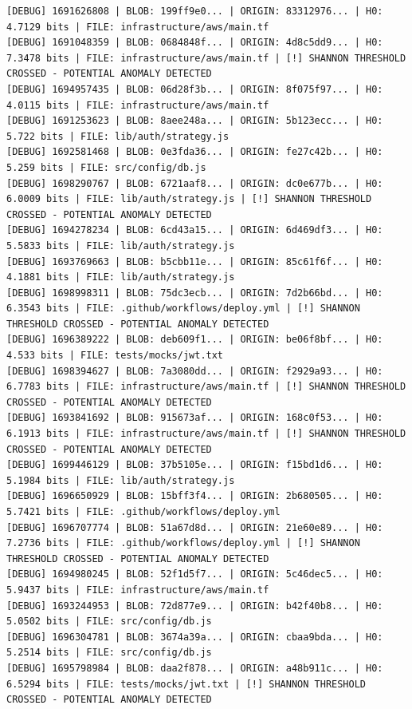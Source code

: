 \documentclass[12pt, a4paper, oneside]{report}
\begin{document}
\begin{lstlisting}[basicstyle=\tiny\ttfamily]
[DEBUG] 1691626808 | BLOB: 199ff9e0... | ORIGIN: 83312976... | H0: 4.7129 bits | FILE: infrastructure/aws/main.tf
[DEBUG] 1691048359 | BLOB: 0684848f... | ORIGIN: 4d8c5dd9... | H0: 7.3478 bits | FILE: infrastructure/aws/main.tf | [!] SHANNON THRESHOLD CROSSED - POTENTIAL ANOMALY DETECTED
[DEBUG] 1694957435 | BLOB: 06d28f3b... | ORIGIN: 8f075f97... | H0: 4.0115 bits | FILE: infrastructure/aws/main.tf
[DEBUG] 1691253623 | BLOB: 8aee248a... | ORIGIN: 5b123ecc... | H0: 5.722 bits | FILE: lib/auth/strategy.js
[DEBUG] 1692581468 | BLOB: 0e3fda36... | ORIGIN: fe27c42b... | H0: 5.259 bits | FILE: src/config/db.js
[DEBUG] 1698290767 | BLOB: 6721aaf8... | ORIGIN: dc0e677b... | H0: 6.0009 bits | FILE: lib/auth/strategy.js | [!] SHANNON THRESHOLD CROSSED - POTENTIAL ANOMALY DETECTED
[DEBUG] 1694278234 | BLOB: 6cd43a15... | ORIGIN: 6d469df3... | H0: 5.5833 bits | FILE: lib/auth/strategy.js
[DEBUG] 1693769663 | BLOB: b5cbb11e... | ORIGIN: 85c61f6f... | H0: 4.1881 bits | FILE: lib/auth/strategy.js
[DEBUG] 1698998311 | BLOB: 75dc3ecb... | ORIGIN: 7d2b66bd... | H0: 6.3543 bits | FILE: .github/workflows/deploy.yml | [!] SHANNON THRESHOLD CROSSED - POTENTIAL ANOMALY DETECTED
[DEBUG] 1696389222 | BLOB: deb609f1... | ORIGIN: be06f8bf... | H0: 4.533 bits | FILE: tests/mocks/jwt.txt
[DEBUG] 1698394627 | BLOB: 7a3080dd... | ORIGIN: f2929a93... | H0: 6.7783 bits | FILE: infrastructure/aws/main.tf | [!] SHANNON THRESHOLD CROSSED - POTENTIAL ANOMALY DETECTED
[DEBUG] 1693841692 | BLOB: 915673af... | ORIGIN: 168c0f53... | H0: 6.1913 bits | FILE: infrastructure/aws/main.tf | [!] SHANNON THRESHOLD CROSSED - POTENTIAL ANOMALY DETECTED
[DEBUG] 1699446129 | BLOB: 37b5105e... | ORIGIN: f15bd1d6... | H0: 5.1984 bits | FILE: lib/auth/strategy.js
[DEBUG] 1696650929 | BLOB: 15bff3f4... | ORIGIN: 2b680505... | H0: 5.7421 bits | FILE: .github/workflows/deploy.yml
[DEBUG] 1696707774 | BLOB: 51a67d8d... | ORIGIN: 21e60e89... | H0: 7.2736 bits | FILE: .github/workflows/deploy.yml | [!] SHANNON THRESHOLD CROSSED - POTENTIAL ANOMALY DETECTED
[DEBUG] 1694980245 | BLOB: 52f1d5f7... | ORIGIN: 5c46dec5... | H0: 5.9437 bits | FILE: infrastructure/aws/main.tf
[DEBUG] 1693244953 | BLOB: 72d877e9... | ORIGIN: b42f40b8... | H0: 5.0502 bits | FILE: src/config/db.js
[DEBUG] 1696304781 | BLOB: 3674a39a... | ORIGIN: cbaa9bda... | H0: 5.2514 bits | FILE: src/config/db.js
[DEBUG] 1695798984 | BLOB: daa2f878... | ORIGIN: a48b911c... | H0: 6.5294 bits | FILE: tests/mocks/jwt.txt | [!] SHANNON THRESHOLD CROSSED - POTENTIAL ANOMALY DETECTED

\end{lstlisting}
\end{document}
